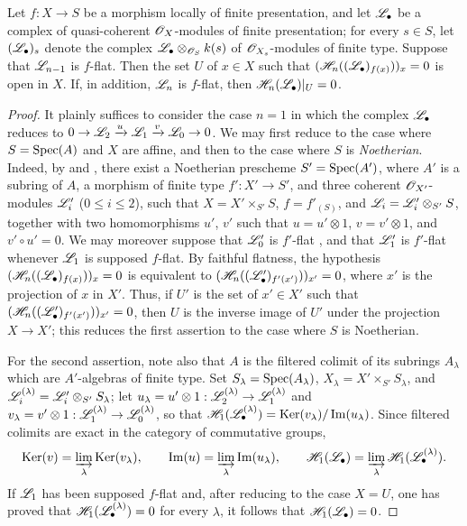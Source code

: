 \begin{proposition}[12.3.3]
\label{IV.12.3.3}
Let $f:X\to S$ be a morphism locally of finite presentation, and let $\mathscr{L}_\bullet$ be a complex of quasi-coherent $\mathscr{O}_X$-modules of finite presentation; for every $s\in S$, let $(\mathscr{L}_\bullet)_s$ denote the complex $\mathscr{L}_\bullet\otimes_{\mathscr{O}_S}k(s)$ of $\mathscr{O}_{X_s}$-modules of finite type.
Suppose that $\mathscr{L}_{n-1}$ is $f$-flat.
Then the set $U$ of $x\in X$ such that $(\mathscr{H}_n((\mathscr{L}_\bullet)_{f(x)}))_x=0$ is open in $X$.
If, in addition, $\mathscr{L}_n$ is $f$-flat, then $\mathscr{H}_n(\mathscr{L}_\bullet)|_U=0$.
\end{proposition}

\begin{proof}
It plainly suffices to consider the case $n=1$ in which the complex $\mathscr{L}_\bullet$ reduces to
$0\to\mathscr{L}_2\xrightarrow{u}\mathscr{L}_1\xrightarrow{v}\mathscr{L}_0\to 0$.
We may first reduce to the case where $S=\operatorname{Spec}(A)$ and $X$
are affine, and then to the case where $S$ is \emph{Noetherian}. Indeed, by  and , there exist a Noetherian prescheme $S'=\operatorname{Spec}(A')$, where $A'$ is a subring of $A$, a morphism of finite type $f':X'\to S'$, and three coherent $\mathscr{O}_{X'}$-modules $\mathscr{L}'_i$ ($0\leqslant i\leqslant 2$), such that
$X=X'\times_{S'}S$, $f=f'_{(S)}$, and $\mathscr{L}_i=\mathscr{L}'_i\otimes_{S'}S$, together with two homomorphisms $u'$, $v'$ such that $u=u'\otimes 1$, $v=v'\otimes 1$, and $v'\circ u'=0$.
We may moreover suppose that $\mathscr{L}'_0$ is $f'$-flat , and that $\mathscr{L}'_1$ is $f'$-flat whenever $\mathscr{L}_1$ is supposed $f$-flat.
By faithful flatness, the hypothesis
$(\mathscr{H}_n((\mathscr{L}_\bullet)_{f(x)}))_x=0$
is equivalent to
$(\mathscr{H}_n((\mathscr{L}'_\bullet)_{f'(x')}))_{x'}=0$,
where $x'$ is the projection of $x$ in $X'$.
Thus, if $U'$ is the set of $x'\in X'$ such that
$(\mathscr{H}_n((\mathscr{L}'_\bullet)_{f'(x')}))_{x'}=0$,
then $U$ is the inverse image of $U'$ under the projection $X\to X'$; this reduces the first assertion to the case where $S$ is Noetherian.

For the second assertion, note also that $A$ is the filtered colimit of its subrings $A_\lambda$ which are $A'$-algebras of finite type.
Set $S_\lambda=\operatorname{Spec}(A_\lambda)$,
$X_\lambda=X'\times_{S'}S_\lambda$, and
$\mathscr{L}^{(\lambda)}_i=\mathscr{L}'_i\otimes_{S'}S_\lambda$; let
$u_\lambda=u'\otimes 1:\mathscr{L}_2^{(\lambda)}\to\mathscr{L}_1^{(\lambda)}$ and
$v_\lambda=v'\otimes 1:\mathscr{L}_1^{(\lambda)}\to\mathscr{L}_0^{(\lambda)}$, so that
$\mathscr{H}_1(\mathscr{L}_\bullet^{(\lambda)})=\operatorname{Ker}(v_\lambda)/\operatorname{Im}(u_\lambda)$.
Since filtered colimits are exact in the category of commutative groups,
\[
  \operatorname{Ker}(v)=\varinjlim_\lambda\operatorname{Ker}(v_\lambda),\qquad
  \operatorname{Im}(u)=\varinjlim_\lambda\operatorname{Im}(u_\lambda),\qquad
  \mathscr{H}_1(\mathscr{L}_\bullet)=\varinjlim_\lambda\mathscr{H}_1(\mathscr{L}_\bullet^{(\lambda)}).
\]
If $\mathscr{L}_1$ has been supposed $f$-flat and, after reducing to the case $X=U$, one has proved that
$\mathscr{H}_1(\mathscr{L}_\bullet^{(\lambda)})=0$ for every $\lambda$, it follows that
$\mathscr{H}_1(\mathscr{L}_\bullet)=0$.


\end{proof}
